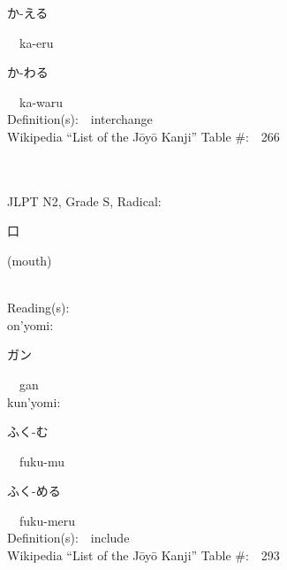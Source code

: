 \begin{multicols}{2}
{\hspace*{2em}}{\begin{CJK}{UTF8}{min} か-える \end{CJK}}\ \ ka-eru\ \ \\
{\hspace*{2em}}{\begin{CJK}{UTF8}{min} か-わる \end{CJK}}\ \ ka-waru\ \ \\
Definition(s):\ \ interchange \\
Wikipedia ``List of the J\=oy\=o Kanji'' Table \#:\ \ 266 \\
\ \ \\
{\fontsize{34pt}{40pt}  }\ \ \\  %
{JLPT N2, Grade S, Radical:\ \ {\begin{CJK}{UTF8}{min} 口 \end{CJK}} (mouth) } \\
Reading(s):\ \ \\
{\hspace*{1em}}on'yomi:\ \ \\
{\hspace*{2em}}{\begin{CJK}{UTF8}{min} ガン \end{CJK}}\ \ gan\ \ \\
{\hspace*{1em}}kun'yomi:\ \ \\
{\hspace*{2em}}{\begin{CJK}{UTF8}{min} ふく-む \end{CJK}}\ \ fuku-mu\ \ \\
{\hspace*{2em}}{\begin{CJK}{UTF8}{min} ふく-める \end{CJK}}\ \ fuku-meru\ \ \\
Definition(s):\ \ include \\
Wikipedia ``List of the J\=oy\=o Kanji'' Table \#:\ \ 293 \\
\ \ \\
{\fontsize{34pt}{40pt}  }\ \ \\  %

\end{multicols}
